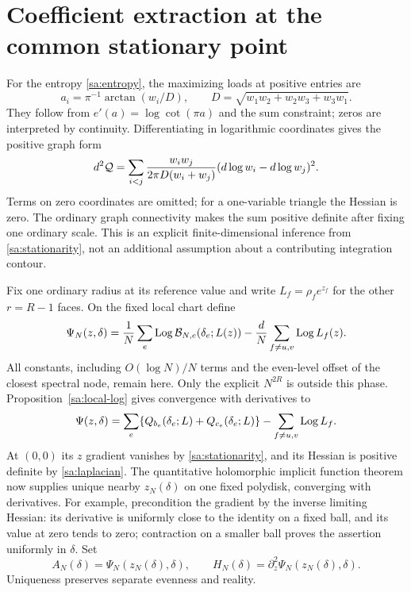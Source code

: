 \section{Coefficient extraction at the common stationary point}\label{sa:saddle}
For the entropy \eqref{sa:entropy}, the maximizing loads at positive
entries are
\[
 a_i=\pi^{-1}\arctan(w_i/D),\qquad
                      D=\sqrt{w_1w_2+w_2w_3+w_3w_1}.
\]
They follow from $e'(a)=\log\cot(\pi a)$ and the sum constraint;
zeros are interpreted by continuity. Differentiating in logarithmic
coordinates gives the positive graph form
\begin{equation}\label{sa:laplacian}
 d^2\mathcal Q=\sum_{i<j}\frac{w_iw_j}{2\pi D(w_i+w_j)}
                          (d\log w_i-d\log w_j)^2.
\end{equation}
Terms on zero coordinates are omitted; for a one-variable triangle
the Hessian is zero. The ordinary graph connectivity makes the sum
positive definite after fixing one ordinary scale. This is an explicit
finite-dimensional inference from \eqref{sa:stationarity}, not an
additional assumption about a contributing integration contour.

Fix one ordinary radius at its reference value and write
$L_f=\rho_f e^{z_f}$ for the other $r=R-1$ faces. On the fixed local
chart define
\begin{equation}\label{sa:Psi}
 \Psi_N(z,\delta)=\frac1N\sum_e\operatorname{Log}\mathcal B_{N,e}(\delta_e;L(z))
                         -\frac dN\sum_{f\ne u,v}\operatorname{Log} L_f(z).
\end{equation}
All constants, including $O(\log N)/N$ terms and the even-level offset of the closest spectral node,
remain here. Only the explicit $N^{2R}$ is outside this phase.
Proposition~\ref{sa:local-log} gives convergence with derivatives to
\[
 \Psi(z,\delta)=\sum_e\{Q_{b_e}(\delta_e;L)+Q_{c_e}(\delta_e;L)\}
                                       -\sum_{f\ne u,v}\operatorname{Log} L_f.
\]
At $(0,0)$ its $z$ gradient vanishes by \eqref{sa:stationarity}, and
its Hessian is positive definite by \eqref{sa:laplacian}.
The quantitative holomorphic implicit function theorem now supplies
unique nearby $z_N(\delta)$ on one fixed polydisk, converging with
derivatives. For example, precondition the gradient by the inverse
limiting Hessian: its derivative is uniformly close to the identity
on a fixed ball, and its value at zero tends to zero; contraction on
a smaller ball proves the assertion uniformly in $\delta$.
Set
\begin{equation}\label{sa:AH}
 A_N(\delta)=\Psi_N(z_N(\delta),\delta),\qquad
 H_N(\delta)=\partial_z^2\Psi_N(z_N(\delta),\delta).
\end{equation}
Uniqueness preserves separate evenness and reality.

